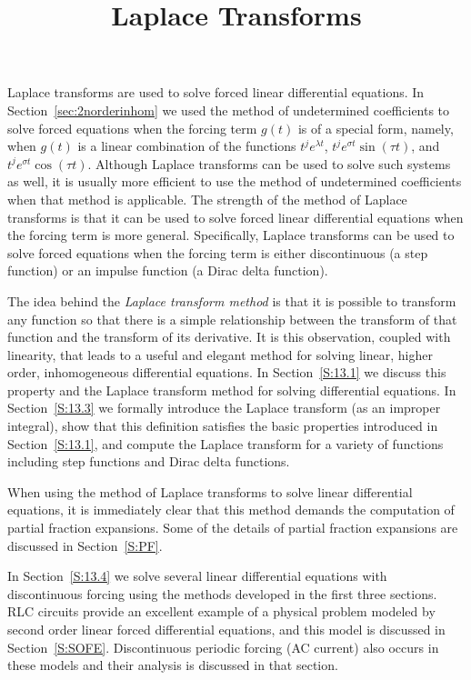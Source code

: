 \documentclass{ximera}
\title{Laplace Transforms}
\begin{document}
\begin{abstract}
\end{abstract}
\maketitle


\label{C:LT}

\normalsize

Laplace transforms are used to solve forced linear differential equations.  
In Section~\ref{sec:2norderinhom} we used the method of undetermined 
coefficients to solve forced equations when the forcing term $g(t)$ is of a 
special form, namely, when $g(t)$ is a linear combination of the functions 
$t^je^{\lambda t}$, $t^je^{\sigma t}\sin(\tau t)$, and 
$t^je^{\sigma t}\cos(\tau t)$.  Although Laplace transforms can be used to 
solve such systems as well, it is usually more efficient to use the method of 
undetermined coefficients when that method is applicable.  The strength of the 
method of Laplace transforms is that it can be used to solve forced linear 
differential equations when the forcing term is more general.  Specifically,
Laplace transforms can be used to solve forced equations when the forcing
term is either discontinuous (a step function) or an impulse function (a Dirac 
delta function).

The idea behind the {\em Laplace transform method} is that it is possible to 
transform any function so that there is a simple relationship between the 
transform of that function and the transform of its derivative.  It is this 
observation, coupled with linearity, that leads to a useful and elegant
method for solving linear, higher order, inhomogeneous differential equations.
In Section~\ref{S:13.1} we discuss this property and the Laplace
transform method for solving differential equations.  In Section~\ref{S:13.3}
we formally introduce the Laplace transform (as an improper integral), show
that this definition satisfies the basic properties introduced in
Section~\ref{S:13.1}, and compute the Laplace transform for a variety of
functions including step functions and Dirac delta functions.

When using the method of Laplace transforms to solve linear differential
equations, it is immediately clear that this method demands the computation of 
partial fraction expansions.  Some of the details of partial fraction
expansions are discussed in Section~\ref{S:PF}.  

In Section~\ref{S:13.4} we solve several linear differential equations with
discontinuous forcing using the methods developed in the first three sections. 
RLC circuits provide an excellent example of a physical problem modeled by
second order linear forced differential equations, and this model is discussed
in Section~\ref{S:SOFE}.  Discontinuous periodic forcing (AC current) also
occurs in these models and their analysis is discussed in that section.
\end{document}
